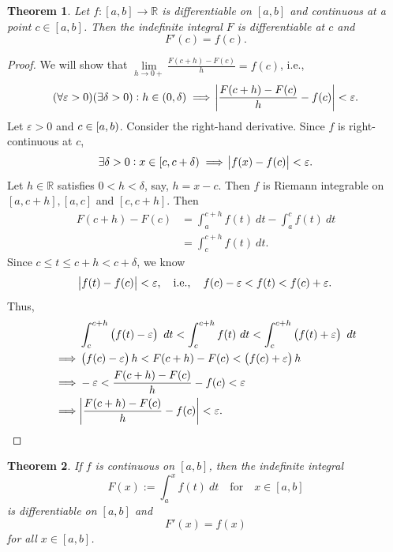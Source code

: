 \documentclass[12pt,openany]{book}
\newtheorem{theorem}{Theorem}[chapter]
\theoremstyle{definition}
\newcommand{\R}{\mathbb{R}}
\newcommand{\ie}{\textnormal{i.e.}}
\begin{document}
	\newpage
	\begin{tcolorbox}[colframe=thmcolor, title={\color{white}\bf $\star$ Fundamental Theorem of Calculus: 2nd form $\star$}]
		\begin{theorem}
			Let $f:[a,b]\to\R$ is differentiable on \([a,b]\) and continuous at a point $c\in[a,b]$. Then the indefinite integral $F$ is differentiable at $c$ and \[
			F'(c)=f(c).
			\]
		\end{theorem}
	\end{tcolorbox}
	\begin{proof}
		We will show that $\lim\limits_{h\to 0+}\frac{F(c+h)-F(c)}{h}=f(c)$, \ie, \[
		(\forall\varepsilon>0)(\exists\delta>0): h\in\intoo{0,\delta}\implies\abs{\frac{F(c+h)-F(c)}{h}-f(c)}<\varepsilon.
		\] Let $\varepsilon>0$ and $c\in\intco{a,b}$. Consider the right-hand derivative. Since $f$ is right-continuous at $c$, \[
		\exists\delta>0:x\in\intco{c,c+\delta}\implies\abs{f(x)-f(c)}<\varepsilon.
		\] Let $h\in\R$ satisfies $0<h<\delta$, say, $h=x-c$. Then $f$ is Riemann integrable on $[a,c+h], [a,c]$ and $[c,c+h]$. Then \begin{align*}
			F(c+h)-F(c)&=\int_a^{c+h}f(t)\ dt -\int_a^cf(t)\ dt\\
			&=\int_c^{c+h}f(t)\ dt.
		\end{align*} Since $c\leq t\leq c+h< c+\delta$, we know \[
		\abs{f(t)-f(c)}<\varepsilon,\quad\ie,\quad f(c)-\varepsilon<f(t)<f(c)+\varepsilon.
		\] Thus, \begin{align*}
			&\int_c^{c+h}\del{f(t)-\varepsilon}\ dt<
			\int_c^{c+h}f(t)\ dt<
			\int_c^{c+h}\del{f(t)+\varepsilon}\ dt\\
			\implies&\del{f(c)-\varepsilon}h<F(c+h)-F(c)<\del{f(c)+\varepsilon}h\\
			\implies&-\varepsilon<\frac{F(c+h)-F(c)}{h}-f(c)<\varepsilon\\
			\implies&\abs{\frac{F(c+h)-F(c)}{h}-f(c)}<\varepsilon.
		\end{align*}
	\end{proof}
	\vspace{15pt}
	\begin{tcolorbox}[colframe=thmcolor, title={\color{white}\bf }]
		\begin{theorem}
			If $f$ is continuous on $[a,b]$, then the indefinite integral \[
			F(x):=\int_a^xf(t)\ dt\quad\text{for}\quad x\in[a,b]
			\] is differentiable on $[a,b]$ and \[
			F'(x)=f(x)
			\] for all $x\in[a,b]$.
		\end{theorem}
	\end{tcolorbox}
	
\end{document}
